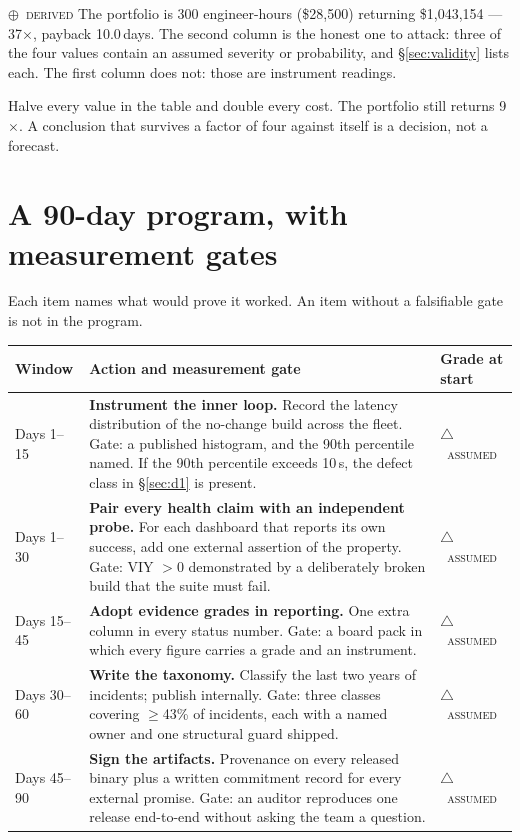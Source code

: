 \documentclass[11pt,a4paper]{article}
\newcommand{\stD}{\textcolor{sigilviolet}{$\oplus$}~{\scriptsize\textsc{derived}}}
\newcommand{\stA}{\textcolor{sigilamber}{$\triangle$}~{\scriptsize\textsc{assumed}}}
\newcommand{\brief}[3]{\begin{tcolorbox}[colback=panelbg,colframe=#1,boxrule=0.8pt,arc=2pt,title=\textbf{#2},coltitle=white,colbacktitle=#1]#3\end{tcolorbox}}
\begin{document}
\noindent \stD{} The portfolio is 300 engineer-hours (\$28{,}500) returning \$1{,}043{,}154 --- 37$\times$, payback 10.0\,days. The second column is the honest one to attack: three of the four values contain an assumed severity or probability, and \S\ref{sec:validity} lists each. The first column does not: those are instrument readings.


\brief{sigilamber}{The rule stated for a sceptic}{Halve every value in the table and double every cost. The portfolio still returns 9$\times$. A conclusion that survives a factor of four against itself is a decision, not a forecast.}


\section{A 90-day program, with measurement gates}\label{sec:program}


Each item names what would prove it worked. An item without a falsifiable gate is not in the program.


\begin{center}\small{}\begin{tabularx}{\textwidth}{@{}lXl@{}}\toprule
Window & Action and measurement gate & Grade at start \\\midrule
Days 1--15 & \textbf{Instrument the inner loop.} Record the latency distribution of the no-change build across the fleet. Gate: a published histogram, and the 90th percentile named. If the 90th percentile exceeds 10\,s, the defect class in \S\ref{sec:d1} is present. & \stA \\
Days 1--30 & \textbf{Pair every health claim with an independent probe.} For each dashboard that reports its own success, add one external assertion of the property. Gate: VIY $>0$ demonstrated by a deliberately broken build that the suite must fail. & \stA \\
Days 15--45 & \textbf{Adopt evidence grades in reporting.} One extra column in every status number. Gate: a board pack in which every figure carries a grade and an instrument. & \stA \\
Days 30--60 & \textbf{Write the taxonomy.} Classify the last two years of incidents; publish internally. Gate: three classes covering $\geq$43\% of incidents, each with a named owner and one structural guard shipped. & \stA \\
Days 45--90 & \textbf{Sign the artifacts.} Provenance on every released binary plus a written commitment record for every external promise. Gate: an auditor reproduces one release end-to-end without asking the team a question. & \stA \\
\bottomrule\end{tabularx}\end{center}
\end{document}
